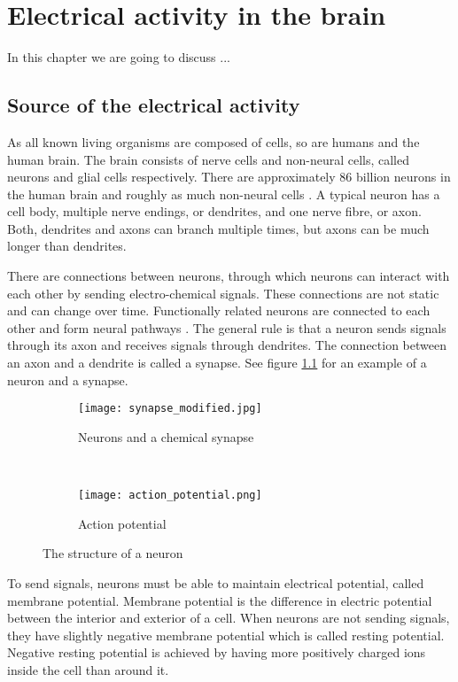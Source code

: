 
\chapter{Electrical activity in the brain}

In this chapter we are going to discuss ...

\section{Source of the electrical activity}
\label{sec:neuron}

As all known living organisms are composed of cells, so are humans and the human brain. The brain consists of nerve cells and non-neural cells, called neurons and glial cells respectively. There are approximately 86 billion neurons in the human brain and roughly as much non-neural cells \cite{neuroncount}. A typical neuron has a cell body, multiple nerve endings, or dendrites, and one nerve fibre, or axon. Both, dendrites and axons can branch multiple times, but axons can be much longer than dendrites. 

There are connections between neurons, through which neurons can interact with each other by sending electro-chemical signals. These connections are not static and can change over time. Functionally related neurons are connected to each other and form neural pathways \cite{neuralpathway}. The general rule is that a neuron sends signals through its axon and receives signals through dendrites. The connection between an axon and a dendrite is called a synapse. See figure \ref{fig:neuron_synapse} for an example of a neuron and a synapse.

\begin{figure}[b!]
	\centering
	\begin{subfigure}{0.48\textwidth}
		\texttt{[image: synapse\_modified.jpg]}
		\caption{Neurons and a chemical synapse \cite[p.~17]{neuronpic}}
		\label{fig:neuron_synapse}
	\end{subfigure}
	~
	\begin{subfigure}{0.48\textwidth}
		\texttt{[image: action\_potential.png]}
		\caption{Action potential \cite{action_potential_pic}}
		\label{fig:action_potential}
	\end{subfigure}
	\caption{The structure of a neuron}
\end{figure}

To send signals, neurons must be able to maintain electrical potential, called membrane potential. Membrane potential is the difference in electric potential between the interior and exterior of a cell. When neurons are not sending signals, they have slightly negative membrane potential which is called resting potential. Negative resting potential is achieved by having more positively charged ions inside the cell than around it.

